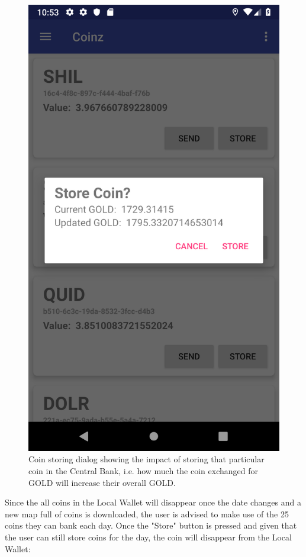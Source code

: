 \documentclass[11pt,a4paper,notitlepage]{article}
\begin{document}
\begin{figure}[H]
    \centering
    \includegraphics[scale=0.25]{screenshots/local-wallet/store-coin-dialog.png}
    \caption{Coin storing dialog showing the impact of storing that particular coin in the Central Bank, i.e. how much the coin exchanged for GOLD will increase their overall GOLD.}
\end{figure}

    Since the all coins in the Local Wallet will disappear once the date changes and a new map full of coins is downloaded, the user is advised to make use of the 25 coins they can bank each day. Once the "Store" button is pressed and given that the user can still store coins for the day, the coin will disappear from the Local Wallet:
\end{document}
